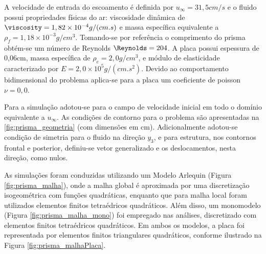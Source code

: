 A velocidade de entrada do escoamento é definida por $u_{\infty} = 31,5 cm/s$ e o fluido possui propriedades físicas do ar: viscosidade dinâmica de $\viscosity=1,82\times10^{-4} g/(cm.s)$ e massa específica equivalente a $\rho_{f} = 1,18\times10^{-3} g/cm^3 $. Tomando-se por referência o comprimento do prisma obtém-se um número de Reynolds $\Reynolds = 204$. A placa possui espessura de 0,06cm, massa específica de $\rho_{e} =  2,0 g/cm^3 $, e módulo de elasticidade caracterizado por $E = 2,0\times10^{5} g/(cm.s^2)$. Devido ao comportamento bidimensional do problema aplica-se para a placa um coeficiente de poisson  $\nu=0,0$.

Para a simulação adotou-se para o campo de velocidade inicial em todo o domínio equivalente a $u_{\infty}$. As condições de contorno para o problema são apresentadas na \autoref{fig:prisma_geometria} (com dimensões em cm). Adicionalmente adotou-se condição de simetria para o fluido na direção $y_3$, e para estrutura, nos contornos frontal e posterior, definiu-se vetor generalizado e os deslocamentos, nesta direção, como nulos.

As simulações foram conduzidas utilizando um Modelo Arlequin (Figura \ref{fig:prisma_malha}), onde a malha global é aproximada por uma discretização isogeométrica com funções quadráticas, enquanto que para malha local foram utilizados elementos finitos tetraédricos quadráticos. Além disso, um monomodelo (Figura \ref{fig:prisma_malha_mono}) foi empregado nas análises, discretizado com elementos finitos tetraédricos quadráticos. Em ambos os modelos, a placa foi representada por elementos finitos triangulares quadráticos, conforme ilustrado na Figura \ref{fig:prisma_malhaPlaca}.

